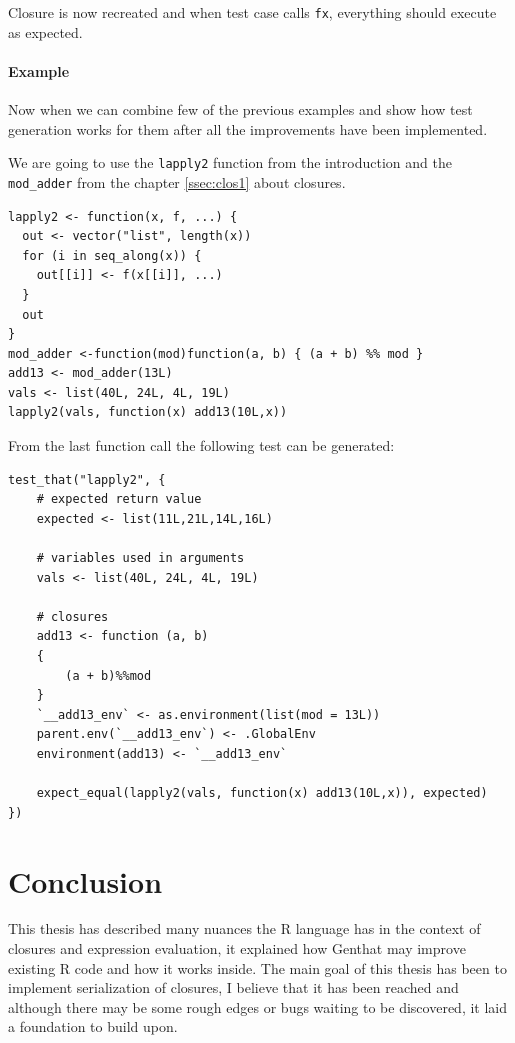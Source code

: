 \documentclass[thesis=B,english]{FITthesis}[2012/10/20]
\begin{document}
Closure is now recreated and when test case calls \verb|fx|, everything should execute as expected.

\subsubsection{Example}
Now when we can combine few of the previous examples and show how test generation works for them after all the improvements have been implemented. 

We are going to use the \verb|lapply2| function from the introduction and the \verb|mod_adder| from the chapter \ref{ssec:clos1} about closures.

\begin{verbatim}
lapply2 <- function(x, f, ...) {
  out <- vector("list", length(x))
  for (i in seq_along(x)) {
    out[[i]] <- f(x[[i]], ...)
  }
  out
}
mod_adder <-function(mod)function(a, b) { (a + b) %% mod }
add13 <- mod_adder(13L)
vals <- list(40L, 24L, 4L, 19L)  
lapply2(vals, function(x) add13(10L,x))
\end{verbatim}

From the last function call the following test can be generated:

\begin{verbatim}
test_that("lapply2", {                   
    # expected return value   
    expected <- list(11L,21L,14L,16L)        
    
    # variables used in arguments                     
    vals <- list(40L, 24L, 4L, 19L)
    
    # closures                     
    add13 <- function (a, b)
    {
        (a + b)%%mod
    }
    `__add13_env` <- as.environment(list(mod = 13L))
    parent.env(`__add13_env`) <- .GlobalEnv
    environment(add13) <- `__add13_env`
    
    expect_equal(lapply2(vals, function(x) add13(10L,x)), expected)
})                               
\end{verbatim}

\chapter{Conclusion}
This thesis has described many nuances the R language has in the context of closures and expression evaluation, it explained how Genthat may improve existing R code and how it works inside. The main goal of this thesis has been to implement serialization of closures, I believe that it has been reached and although there may be some rough edges or bugs waiting to be discovered, it laid a foundation to build upon. 
\end{document}
